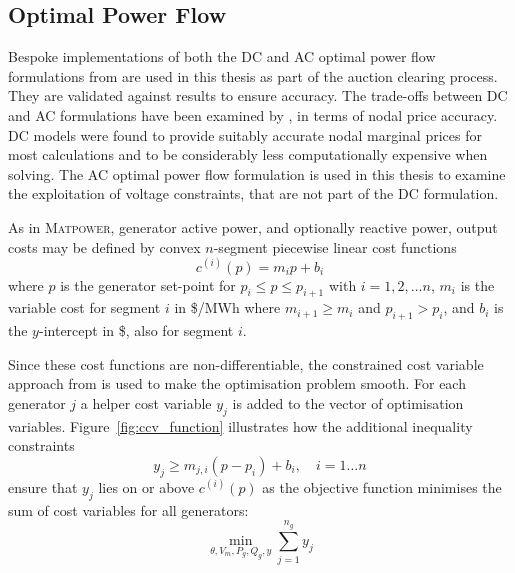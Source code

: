 \subsection{Optimal Power Flow}
\label{sec:pw_linear}
Bespoke implementations of both the DC and AC optimal power flow formulations
from \matpower are used in this thesis as part of the auction clearing process.
They are validated against \matpower results to ensure accuracy. The trade-offs
between DC and AC formulations have been examined by , in
terms of nodal price accuracy. DC models were found to provide suitably accurate
nodal marginal prices for most  calculations and to be considerably less
computationally expensive when solving. The AC optimal power flow formulation is
used in this thesis to examine the exploitation of voltage constraints, that are
not part of the DC formulation.

%

As in \textsc{Matpower}, generator active power, and optionally reactive power,
output costs may be defined by convex $n$-segment piecewise linear cost
functions
\begin{equation}
c^{(i)}(p) = m_ip + b_i
\end{equation}
where $p$ is the generator set-point for $p_i \leq p \leq p_{i+1}$ with
$i = 1,2,\dotsc n$, $m_i$ is the variable cost for segment $i$ in
\$/MWh where $m_{i+1} \geq m_i$ and $p_{i+1} > p_i$, and $b_i$ is the
$y$-intercept in \$, also for segment $i$.


Since these cost functions are non-differentiable, the constrained cost variable
approach from  is used to make the optimisation problem
smooth.  For each generator $j$ a helper cost variable $y_j$ is added to the
vector of optimisation variables.  Figure~\ref{fig:ccv_function}
\cite[Figure5-3]{pserc:mp_manual} illustrates how the additional inequality
constraints
\begin{equation}
y_j \geq m_{j,i}(p-p_i) + b_i, \quad i = 1\dotsc n
\end{equation}
ensure that $y_j$ lies on or above $c^{(i)}(p)$ as the objective function
minimises the sum of cost variables for all generators:
\begin{equation}
\min_{\theta, V_m, P_g, Q_g, y} \sum_{j=1}^{n_g}y_j
\end{equation}

